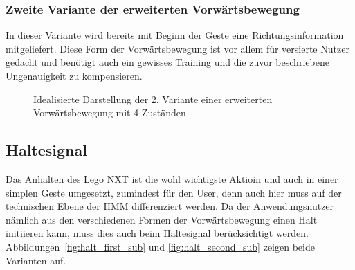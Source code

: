 \subsubsection{Zweite Variante der erweiterten Vorw\"artsbewegung}

In dieser Variante wird bereits mit Beginn der Geste eine Richtungsinformation mitgeliefert. Diese Form der Vorw\"artsbewegung ist vor allem f\"ur versierte Nutzer gedacht und ben\"otigt auch ein gewisses Training und die zuvor beschriebene Ungenauigkeit zu kompensieren.

\begin{figure}[htb]
\centering
{}
\caption[Idealisierte Darstellung der 2. Variante einer erweiterten Vorw\"artsbewegung mit 4 Zust\"anden]{Idealisierte Darstellung der 2. Variante einer erweiterten Vorw\"artsbewegung mit 4 Zust\"anden}
\label{fig:Forward_ideal_var2}
\end{figure}

\subsection{Haltesignal}
Das Anhalten des Lego NXT ist die wohl wichtigste Aktioin und auch in einer simplen Geste umgesetzt, zumindest f\"ur den User, denn auch hier muss auf der technischen Ebene der \gls{HMM} differenziert werden. Da der Anwendungsnutzer n\"amlich aus den verschiedenen Formen der Vorw\"artsbewegung einen Halt initiieren kann, muss dies auch beim Haltesignal ber\"ucksichtigt werden. Abbildungen~\ref{fig:halt_first_sub} und \ref{fig:halt_second_sub} zeigen beide Varianten auf.

